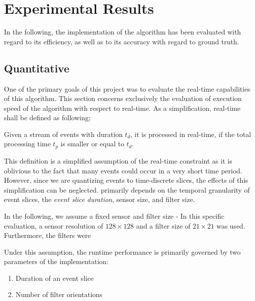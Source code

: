 \newpage
\section{Experimental Results}
In the following, the implementation of the algorithm has been evaluated with regard to its efficiency, as well as to its accuracy with regard to ground truth.

\subsection{Quantitative}
One of the primary goals of this project was to evaluate the real-time capabilities of this algorithm.
This section concerns exclusively the evaluation of execution speed of the algorithm with respect to real-time. As a simplification, real-time shall be defined as following;
\begin{defwrp}
	Given a stream of events with duration $t_d$, it is processed in real-time, if the total processing time $t_p$ is smaller or equal to $t_d$.
\end{defwrp}

This definition is a simplified assumption of the real-time constraint as it is oblivious to the fact that many events could occur in a very short time period.
However, since we are quantizing events to time-discrete slices, the effects of this simplification can be neglected.
 primarily depends on the temporal granularity of event slices,  the \textit{event slice duration}, sensor size, and filter size.

In the following, we assume a fixed sensor and filter size - 
In this specific evaluation, a sensor resolution of $128\times128$ and a filter size of $21\times21$ was used.
Furthermore, the filters were 

Under this assumption, the runtime performance is primarily governed by two parameters of the implementation:
\begin{enumerate}
	\item Duration of an event slice
	\item Number of filter orientations
\end{enumerate}

